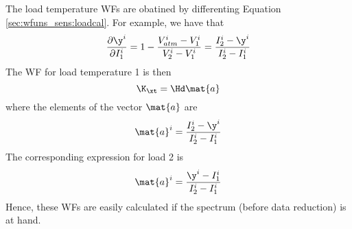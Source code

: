  The load temperature WFs are obatined by differenting Equation
 \ref{sec:wfuns_sens:loadcal}. For example, we have that \citep{eriksson:97a}
 \begin{equation}
   \frac{\partial \y^i}{\partial I_1^i} = 1 - 
     \frac{V_{atm}^i-V_1^i}{V_2^i-V_1^i} = \frac{I_2^i-\y^i}{I_2^i-I_1^i} 
 \end{equation}
 The WF for load temperature 1 is then
 \begin{equation}
   \K_{\xt} = \Hd \mat{a}
 \end{equation}
 where the elements of the vector $\mat{a}$ are
 \begin{equation}
   \mat{a}^i = \frac{I_2^i-\y^i}{I_2^i-I_1^i}
 \end{equation}
 The corresponding expression for load 2 is
 \begin{equation}
   \mat{a}^i = \frac{\y^i-I_1^i}{I_2^i-I_1^i}
 \end{equation}
 Hence, these WFs are easily calculated if the spectrum (before data
 reduction) is at hand.



% 
%
% 
%
%
%





